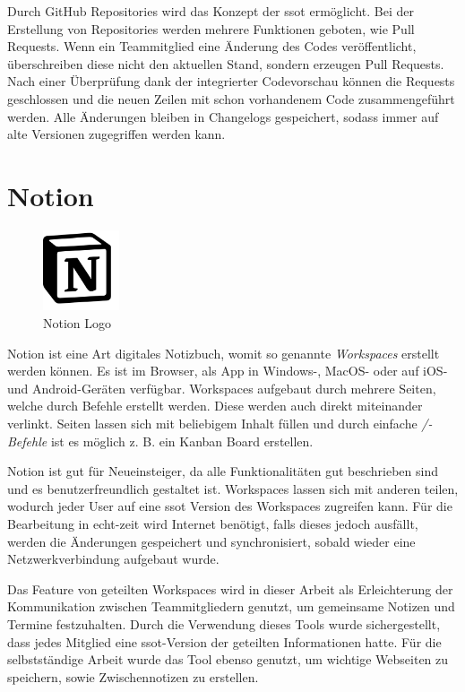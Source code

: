 Durch GitHub Repositories wird das Konzept der \gls{ssot} ermöglicht. 
Bei der Erstellung von Repositories werden mehrere Funktionen geboten, wie Pull Requests. 
Wenn ein Teammitglied eine Änderung des Codes veröffentlicht, überschreiben diese nicht den aktuellen Stand, sondern erzeugen Pull Requests.
Nach einer Überprüfung dank der integrierter Codevorschau können die Requests geschlossen und die neuen Zeilen mit schon vorhandenem Code zusammengeführt werden. 
Alle Änderungen bleiben in Changelogs gespeichert, sodass immer auf alte Versionen zugegriffen werden kann.
\cite{githubAbout}

\section{Notion}
\begin{figure}
  \begin{center}
    \includegraphics[width=0.2\textwidth]{pics/logos/notion.png}
   \caption{Notion Logo}
  \end{center}
\end{figure}

Notion ist eine Art digitales Notizbuch, womit so genannte \emph{Workspaces} erstellt werden können. 
Es ist im Browser, als App in Windows-, MacOS- oder auf iOS- und Android-Geräten verfügbar. 
Workspaces aufgebaut durch mehrere Seiten, welche durch Befehle erstellt werden. 
Diese werden auch direkt miteinander verlinkt.
Seiten lassen sich mit beliebigem Inhalt füllen und durch einfache \emph{/-Befehle} ist es möglich z. B. ein Kanban Board erstellen. 
\cite{NotionAbout}

Notion ist gut für Neueinsteiger, da alle Funktionalitäten gut beschrieben sind und es benutzerfreundlich gestaltet ist.
Workspaces lassen sich mit anderen teilen, wodurch jeder User auf eine \gls{ssot} Version des Workspaces zugreifen kann.
Für die Bearbeitung in echt-zeit wird Internet benötigt, falls dieses jedoch ausfällt, werden die Änderungen gespeichert und synchronisiert, sobald wieder eine Netzwerkverbindung aufgebaut wurde.
\cite{NotionAbout}

Das Feature von geteilten Workspaces wird in dieser Arbeit als Erleichterung der Kommunikation zwischen Teammitgliedern genutzt, um gemeinsame Notizen und Termine festzuhalten. 
Durch die Verwendung dieses Tools wurde sichergestellt, dass jedes Mitglied eine \gls{ssot}-Version der geteilten Informationen hatte.
Für die selbstständige Arbeit wurde das Tool ebenso genutzt, um wichtige Webseiten zu speichern, sowie Zwischennotizen zu erstellen. 

